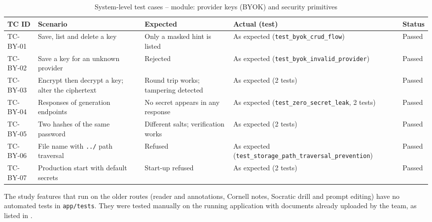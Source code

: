 \begin{table}[!htbp]
\centering
\caption{System-level test cases -- module: provider keys (BYOK) and security primitives}\label{tab:tc_byok}
\tcbody
\begin{tabularx}{\textwidth}{@{}l Y Y Y l@{}}
\toprule
\textbf{TC ID} & \textbf{Scenario} & \textbf{Expected} & \textbf{Actual (test)} & \textbf{Status}\\
\midrule
TC-BY-01 & Save, list and delete a key & Only a masked hint is listed & As expected (\texttt{test\_byok\_crud\_flow}) & Passed\\
TC-BY-02 & Save a key for an unknown provider & Rejected & As expected (\texttt{test\_byok\_invalid\_provider}) & Passed\\
TC-BY-03 & Encrypt then decrypt a key; alter the ciphertext & Round trip works; tampering detected & As expected (2 tests) & Passed\\
TC-BY-04 & Responses of generation endpoints & No secret appears in any response & As expected (\texttt{test\_zero\_secret\_leak}, 2 tests) & Passed\\
TC-BY-05 & Two hashes of the same password & Different salts; verification works & As expected (2 tests) & Passed\\
TC-BY-06 & File name with \texttt{../} path traversal & Refused & As expected (\texttt{test\_storage\_path\_traversal\_prevention}) & Passed\\
TC-BY-07 & Production start with default secrets & Start-up refused & As expected (2 tests) & Passed\\
\bottomrule
\end{tabularx}
\end{table}

The study features that run on the older routes (reader and annotations, Cornell notes, Socratic drill and
prompt editing) have no automated tests in \texttt{app/tests}. They were tested manually on the running
application with documents already uploaded by the team, as listed in .

